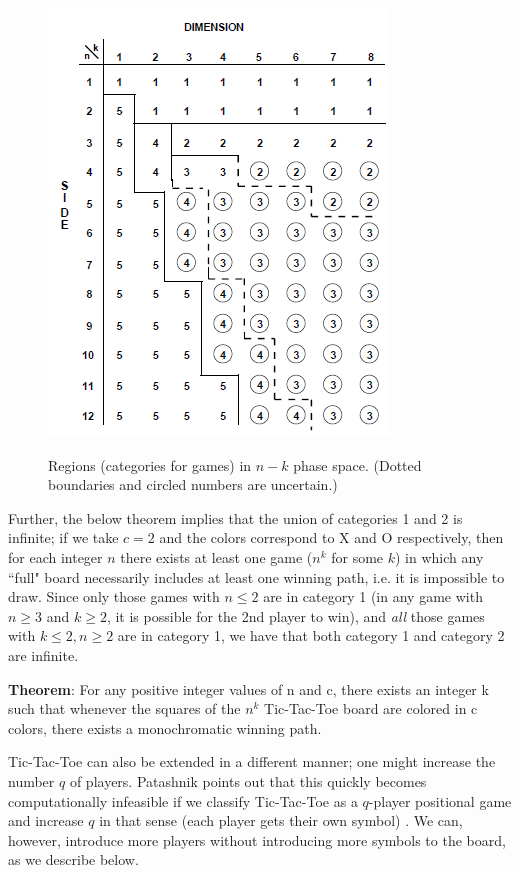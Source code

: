 \documentclass[12pt,a4paper]{article}
\begin{document}
\begin{figure}[!h]
	\centering
	\includegraphics[scale=1]{./img/golomb.png}
	\caption{Regions (categories for games) in $n - k$ phase space. (Dotted boundaries and circled numbers are uncertain.)} \cite{golomb2002hypercube}
	\label{fig:golomb_table}
\end{figure}

Further, the below theorem implies that the union of categories 1 and 2 is infinite; if we take $c=2$ and the colors correspond to X and O respectively, then for each integer $n$ there exists at least one game ($n^k$ for some $k$) in which any ``full" board necessarily includes at least one winning path, i.e. it is impossible to draw.
Since only those games with $n\leq 2$ are in category 1 (in any game with $n \geq 3$ and $k \geq 2$, it is possible for the 2nd player to win), and \emph{all} those games with $k \leq 2, n \geq 2$ are in category 1, we have that both category 1 and category 2 are infinite. 
\begin{displayquote}
	\textbf{Theorem}: 
	For any positive integer values of n and c, there exists an integer k such that
	whenever the squares of the $n^k$ Tic-Tac-Toe board are colored in c colors, there exists a monochromatic winning path.\cite{trick3norman}
\end{displayquote}


Tic-Tac-Toe can also be extended in a different manner; one might increase the number $q$ of players. Patashnik points out that this quickly becomes computationally infeasible if we classify Tic-Tac-Toe as a $q$-player positional game and increase $q$ in that sense (each player gets their own symbol) \cite{patashnik1980qubic}. We can, however, introduce more players without introducing more symbols to the board, as we describe below.
\end{document}
